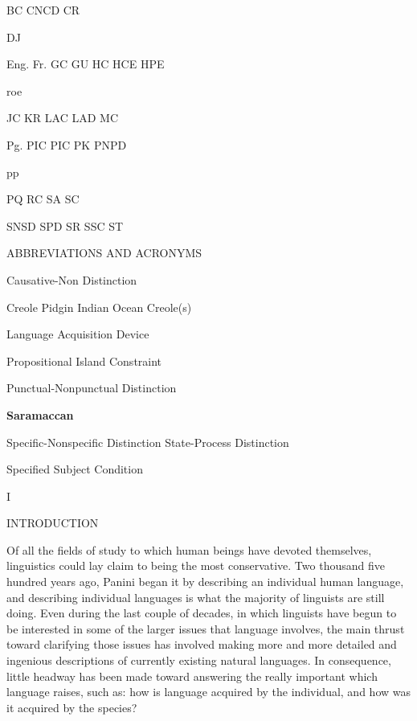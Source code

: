 
BC CNCD CR

DJ

Eng. Fr. GC GU HC HCE HPE

roe

JC KR LAC LAD MC

Pg. PIC PIC PK PNPD

pp

PQ RC SA SC

SNSD SPD SR SSC ST

ABBREVIATIONS AND ACRONYMS


Causative-Non Distinction 

  

 


 Creole   Pidgin  Indian Ocean Creole(s) 


 Language Acquisition Device 


Propositional Island Constraint 


Punctual-Nonpunctual Distinction 

  \textbf{Saramaccan} 

Specific-Nonspecific Distinction State-Process Distinction


Specified Subject Condition 

I

\hypertarget{TOC250000}{}INTRODUCTION

Of all the fields of study to which human beings have devoted themselves, linguistics could lay claim to being the most conservative. Two thousand five hundred years ago, Panini began it by describing an individual human language, and describing individual languages is what the majority of linguists are still doing. Even during the last couple of decades, in which linguists have begun to be interested in some of the larger issues that language involves, the main thrust toward clarifying those issues has involved making more and more detailed and ingenious descriptions of currently existing natural languages. In consequence, little headway has been made toward answering the really important  which language raises, such as: how is language acquired by the individual, and how was it acquired by the species?

